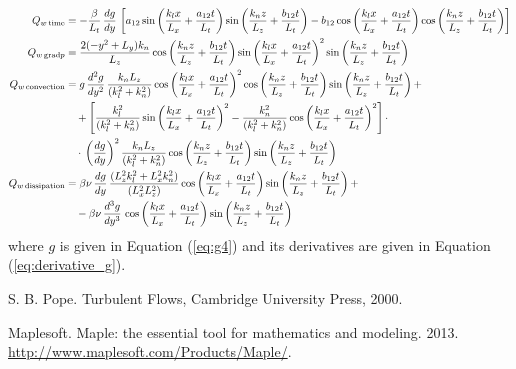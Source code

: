 \documentclass[10pt]{article}
\newcommand{\convection}{\,\text{convection}}
\newcommand{\gradp}{\,\text{grad}p}
\newcommand{\dissipation}{\,\text{dissipation}}
\begin{document}
\begin{equation*}
\begin{split}
Q_{w \,\text{time}} &=-\dfrac{\beta}{L_t} \,\dfrac{dg}{dy}\,\left[a_{12} \sin\left(\dfrac{k_l x}{L_x}+\dfrac{a_{12} t}{L_t} \right) \sin\left(\dfrac{k_n z}{L_z}+\dfrac{b_{12} t}{L_t} \right)-b_{12} \cos\left(\dfrac{k_l x}{L_x}+\dfrac{a_{12} t}{L_t} \right) \cos\left(\dfrac{k_n z}{L_z}+\dfrac{b_{12} t}{L_t} \right)\right] \vspace{8pt}\\ 
%
Q_{w \gradp} &= \dfrac{2 (-y^2+L_y) k_n}{L_z} \cos\left(\dfrac{k_n z}{L_z}+\dfrac{b_{12} t}{L_t} \right) \sin\left(\dfrac{k_l x}{L_x}+\dfrac{a_{12} t}{L_t} \right)^2 \sin\left(\dfrac{k_n z}{L_z}+\dfrac{b_{12} t}{L_t} \right)\vspace{8pt}\\ 
%
Q_{w \convection} &=  g \,\dfrac{d^2g}{dy^2}\, \dfrac{k_n L_z}{(k_l^2+k_n^2)} \cos\left(\dfrac{k_l x}{L_x}+\dfrac{a_{12} t}{L_t} \right)^2 \cos\left(\dfrac{k_n z}{L_z}+\dfrac{b_{12} t}{L_t} \right) \sin\left(\dfrac{k_n z}{L_z}+\dfrac{b_{12} t}{L_t} \right)+\\
	&\quad+\left[\dfrac{k_l^2}{(k_l^2+k_n^2)} \sin\left(\dfrac{k_l x}{L_x}+\dfrac{a_{12} t}{L_t} \right)^2-\dfrac{k_n^2}{(k_l^2+k_n^2)} \cos\left(\dfrac{k_l x}{L_x}+\dfrac{a_{12} t}{L_t} \right)^2\right]\cdot \\ 
	&\quad\cdot \,\left(\dfrac{dg}{dy}\right)^2 \dfrac{k_n L_z}{(k_l^2+k_n^2)} \cos\left(\dfrac{k_n z}{L_z}+\dfrac{b_{12} t}{L_t} \right) \sin\left(\dfrac{k_n z}{L_z}+\dfrac{b_{12} t}{L_t} \right)\vspace{8pt}\\
% 
%
Q_{w \dissipation} &= \beta \nu \,\dfrac{dg}{dy}\,\dfrac{(L_z^2 k_l^2+L_x^2 k_n^2)}{(L_x^2 L_z^2)}  \cos\left(\dfrac{k_l x}{L_x}+\dfrac{a_{12} t}{L_t} \right) \sin\left(\dfrac{k_n z}{L_z}+\dfrac{b_{12} t}{L_t} \right)+\\
	&\quad-\beta \nu \,\dfrac{d^3g}{dy^3}\, \cos\left(\dfrac{k_l x}{L_x}+\dfrac{a_{12} t}{L_t} \right) \sin\left(\dfrac{k_n z}{L_z}+\dfrac{b_{12} t}{L_t} \right)
\end{split}
\end{equation*}
where $g$ is given in Equation (\ref{eq:g4}) and its derivatives are given in Equation (\ref{eq:derivative_g}).


% 
 \begin{thebibliography}{99}
% 
S. B. Pope. Turbulent Flows, Cambridge University Press, 2000.


Maplesoft. Maple: the essential tool for mathematics and modeling. 2013.
\url{http://www.maplesoft.com/Products/Maple/}.

 \end{thebibliography}
\end{document}
